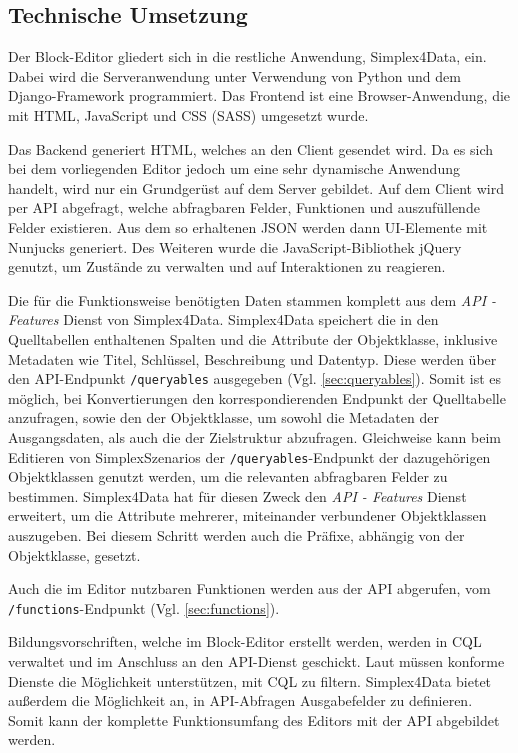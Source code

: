 \subsection{Technische Umsetzung}
Der Block-Editor gliedert sich in die restliche Anwendung, Simplex4Data, ein. Dabei wird die Serveranwendung unter Verwendung von Python und dem Django-Framework \parencite{djangosoftwarefoundationDjango} programmiert. Das Frontend ist eine Browser-Anwendung, die mit \ac{HTML}, JavaScript und \ac{CSS} (\ac{SASS}) umgesetzt wurde.

Das Backend generiert \ac{HTML}, welches an den Client gesendet wird. Da es sich bei dem vorliegenden Editor jedoch um eine sehr dynamische Anwendung handelt, wird nur ein Grundgerüst auf dem Server gebildet. Auf dem Client wird per \ac{API} abgefragt, welche abfragbaren Felder, Funktionen und auszufüllende Felder existieren. Aus dem so erhaltenen \ac{JSON} werden dann UI-Elemente mit Nunjucks \parencite{mozillaNunjucks} generiert. Des Weiteren wurde die JavaScript-Bibliothek jQuery \parencite{openjsfoundationJQuery} genutzt, um Zustände zu verwalten und auf Interaktionen zu reagieren.

Die für die Funktionsweise benötigten Daten stammen komplett aus dem \textit{API - Features} Dienst \parencite{ogcAPI} von Simplex4Data. Simplex4Data speichert die in den Quelltabellen enthaltenen Spalten und die Attribute der Objektklasse, inklusive Metadaten wie Titel, Schlüssel, Beschreibung und Datentyp. Diese werden über den \ac{API}-Endpunkt \texttt{/queryables} ausgegeben (Vgl. \ref{sec:queryables}). Somit ist es möglich, bei Konvertierungen den korrespondierenden Endpunkt der Quelltabelle anzufragen, sowie den der Objektklasse, um sowohl die Metadaten der Ausgangsdaten, als auch die der Zielstruktur abzufragen. Gleichweise kann beim Editieren von SimplexSzenarios der \texttt{/queryables}-Endpunkt der dazugehörigen Objektklassen genutzt werden, um die relevanten abfragbaren Felder zu bestimmen. Simplex4Data hat für diesen Zweck den \textit{API - Features} Dienst erweitert, um die Attribute mehrerer, miteinander verbundener Objektklassen auszugeben. Bei diesem Schritt werden auch die Präfixe, abhängig von der Objektklasse, gesetzt.

Auch die im Editor nutzbaren Funktionen werden aus der \ac{API} abgerufen, vom \texttt{/functions}-Endpunkt (Vgl. \ref{sec:functions}).

Bildungsvorschriften, welche im Block-Editor erstellt werden, werden in \ac{CQL} verwaltet und im Anschluss an den \ac{API}-Dienst geschickt. Laut  müssen konforme Dienste die Möglichkeit unterstützen, mit \ac{CQL} zu filtern. Simplex4Data bietet außerdem die Möglichkeit an, in \ac{API}-Abfragen Ausgabefelder zu definieren. Somit kann der komplette Funktionsumfang des Editors mit der \ac{API} abgebildet werden.
